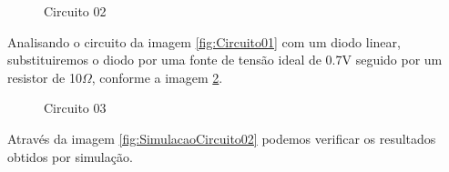 \begin{figure}[H]
    \centering
    \caption{Circuito 02}
    \vspace{-0.3cm}
    \label{fig:Circuito02}
\end{figure}

Analisando o circuito da imagem \ref{fig:Circuito01} com um diodo linear, substituiremos o diodo por uma fonte de tensão ideal de 0.7V seguido por um resistor de 10$\Omega$, conforme a imagem \ref{fig:Circuito03}.

\begin{figure}[H]
    \centering
    \caption{Circuito 03}
    \vspace{-0.3cm}
    \label{fig:Circuito03}
\end{figure}

\begin{Resolucao}[H]
    \label{res:Circuito02}
\end{Resolucao}

Através da imagem \ref{fig:SimulacaoCircuito02} podemos verificar os resultados obtidos por simulação. 

